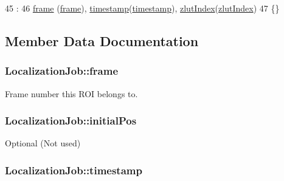 \begin{DoxyCode}
45                                                                                 :
46         \hyperlink{struct_localization_job_a54df1ba33ab48b20dca664142a8cf619}{frame} (\hyperlink{struct_localization_job_a54df1ba33ab48b20dca664142a8cf619}{frame}), \hyperlink{struct_localization_job_a82f4cdb35dd3b6765df52dd045007286}{timestamp}(\hyperlink{struct_localization_job_a82f4cdb35dd3b6765df52dd045007286}{timestamp}), 
      \hyperlink{struct_localization_job_afcf9f91b72597af0e2572f3ae74d9a99}{zlutIndex}(\hyperlink{struct_localization_job_afcf9f91b72597af0e2572f3ae74d9a99}{zlutIndex}) 
47     \{\}
\end{DoxyCode}


\subsection{Member Data Documentation}
\subsubsection[{\texorpdfstring{frame}{frame}}]{ Localization\+Job\+::frame}\hypertarget{struct_localization_job_a54df1ba33ab48b20dca664142a8cf619}{}\label{struct_localization_job_a54df1ba33ab48b20dca664142a8cf619}


Frame number this R\+OI belongs to. 

\subsubsection[{\texorpdfstring{initial\+Pos}{initialPos}}]{ Localization\+Job\+::initial\+Pos}\hypertarget{struct_localization_job_a6374e6cba33c93846a757328b13aa509}{}\label{struct_localization_job_a6374e6cba33c93846a757328b13aa509}


Optional (Not used) 

\subsubsection[{\texorpdfstring{timestamp}{timestamp}}]{ Localization\+Job\+::timestamp}\hypertarget{struct_localization_job_a82f4cdb35dd3b6765df52dd045007286}{}\label{struct_localization_job_a82f4cdb35dd3b6765df52dd045007286}



